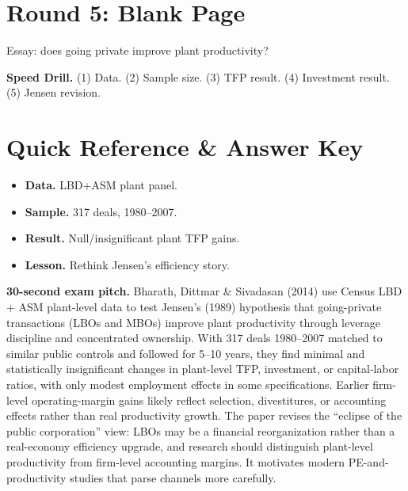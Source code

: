 \documentclass[11pt]{article}
\begin{document}
\section*{Round 5: Blank Page}
Essay: does going private improve plant productivity?

\vspace{6pt}
\begin{drillbox}
\textbf{Speed Drill.} (1) Data. (2) Sample size. (3) TFP result. (4) Investment result. (5) Jensen revision.
\end{drillbox}

\section*{Quick Reference \& Answer Key}
\begin{answerbox}
\begin{itemize}
\item \textbf{Data.} LBD+ASM plant panel.
\item \textbf{Sample.} 317 deals, 1980--2007.
\item \textbf{Result.} Null/insignificant plant TFP gains.
\item \textbf{Lesson.} Rethink Jensen's efficiency story.
\end{itemize}
\end{answerbox}

\begin{keybox}
\textbf{30-second exam pitch.} Bharath, Dittmar \& Sivadasan (2014) use Census LBD + ASM plant-level data to test Jensen's (1989) hypothesis that going-private transactions (LBOs and MBOs) improve plant productivity through leverage discipline and concentrated ownership. With 317 deals 1980--2007 matched to similar public controls and followed for 5--10 years, they find minimal and statistically insignificant changes in plant-level TFP, investment, or capital-labor ratios, with only modest employment effects in some specifications. Earlier firm-level operating-margin gains likely reflect selection, divestitures, or accounting effects rather than real productivity growth. The paper revises the ``eclipse of the public corporation'' view: LBOs may be a financial reorganization rather than a real-economy efficiency upgrade, and research should distinguish plant-level productivity from firm-level accounting margins. It motivates modern PE-and-productivity studies that parse channels more carefully.
\end{keybox}
\end{document}
